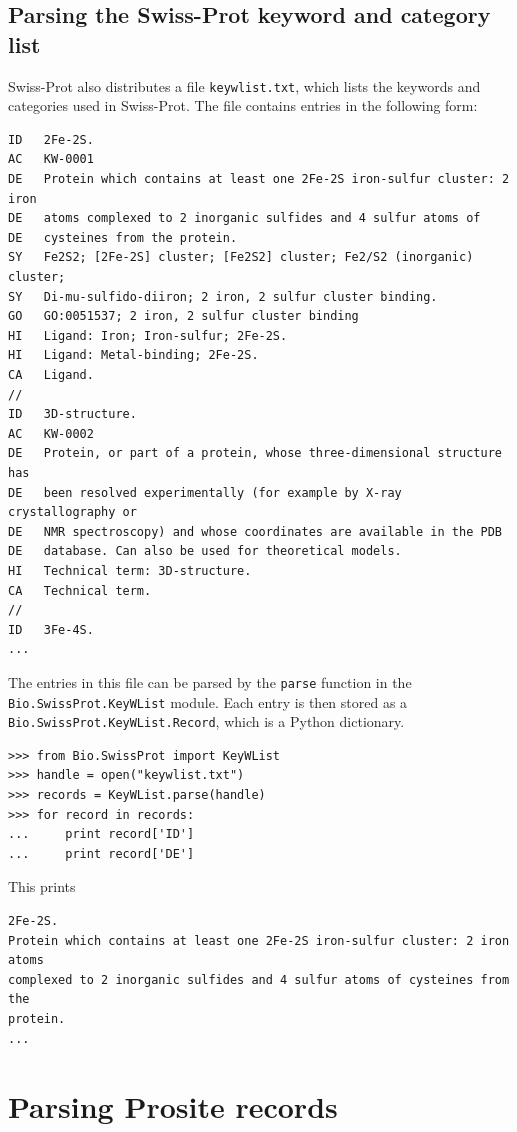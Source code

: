 \documentclass{report}
\begin{document}
\subsection{Parsing the Swiss-Prot keyword and category list}

Swiss-Prot also distributes a file \verb+keywlist.txt+, which lists the keywords and categories used in Swiss-Prot. The file contains entries in the following form:

\begin{verbatim}
ID   2Fe-2S.
AC   KW-0001
DE   Protein which contains at least one 2Fe-2S iron-sulfur cluster: 2 iron
DE   atoms complexed to 2 inorganic sulfides and 4 sulfur atoms of
DE   cysteines from the protein.
SY   Fe2S2; [2Fe-2S] cluster; [Fe2S2] cluster; Fe2/S2 (inorganic) cluster;
SY   Di-mu-sulfido-diiron; 2 iron, 2 sulfur cluster binding.
GO   GO:0051537; 2 iron, 2 sulfur cluster binding
HI   Ligand: Iron; Iron-sulfur; 2Fe-2S.
HI   Ligand: Metal-binding; 2Fe-2S.
CA   Ligand.
//
ID   3D-structure.
AC   KW-0002
DE   Protein, or part of a protein, whose three-dimensional structure has
DE   been resolved experimentally (for example by X-ray crystallography or
DE   NMR spectroscopy) and whose coordinates are available in the PDB
DE   database. Can also be used for theoretical models.
HI   Technical term: 3D-structure.
CA   Technical term.
//
ID   3Fe-4S.
...
\end{verbatim}

The entries in this file can be parsed by the \verb+parse+ function in the \verb+Bio.SwissProt.KeyWList+ module. Each entry is then stored as a \verb+Bio.SwissProt.KeyWList.Record+, which is a Python dictionary.

\begin{verbatim}
>>> from Bio.SwissProt import KeyWList
>>> handle = open("keywlist.txt")
>>> records = KeyWList.parse(handle)
>>> for record in records:
...     print record['ID']
...     print record['DE']
\end{verbatim}

This prints
\begin{verbatim}
2Fe-2S.
Protein which contains at least one 2Fe-2S iron-sulfur cluster: 2 iron atoms
complexed to 2 inorganic sulfides and 4 sulfur atoms of cysteines from the
protein.
...
\end{verbatim}

\section{Parsing Prosite records}
\end{document}
